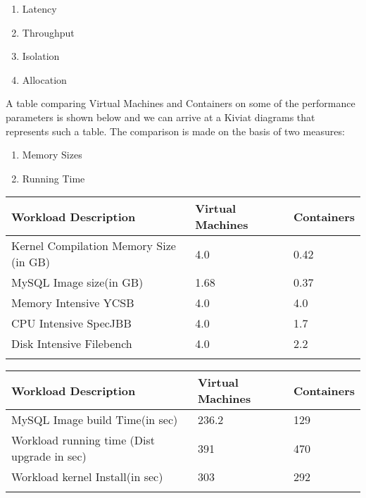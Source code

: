 \begin{enumerate}
    \item Latency
    \item Throughput
    \item Isolation
    \item Allocation
\end{enumerate}

A table comparing Virtual Machines and Containers on some of the performance parameters is shown below and we can arrive at a Kiviat diagrams that represents such a table.
The comparison is made on the basis of two measures:
\begin{enumerate}
    \item Memory Sizes
    \item Running Time
\end{enumerate}


\begin{longtable}[H]{|p{}|p{}|p{}|}
\hline\hline
Workload Description&Virtual Machines&Containers\\
\hline\hline
\hline
Kernel Compilation Memory Size (in GB)&4.0&0.42\\
\hline
MySQL Image size(in GB)&1.68&0.37\\
\hline
Memory Intensive YCSB&4.0&4.0\\
\hline
CPU Intensive SpecJBB&4.0&1.7\\
\hline
Disk Intensive Filebench&4.0&2.2\\
\hline
\hline\hline
\label{tab:tab3}
\end{longtable}



\begin{longtable}[H]{|p{}|p{}|p{}|}
\hline\hline
Workload Description&Virtual Machines&Containers\\
\hline\hline
\hline
MySQL Image build Time(in sec)&236.2&129\\
\hline
Workload running time (Dist upgrade in sec)&391&470\\
\hline
Workload kernel Install(in sec)&303&292\\
\hline
\hline\hline
\label{tab:tab4}
\end{longtable}

